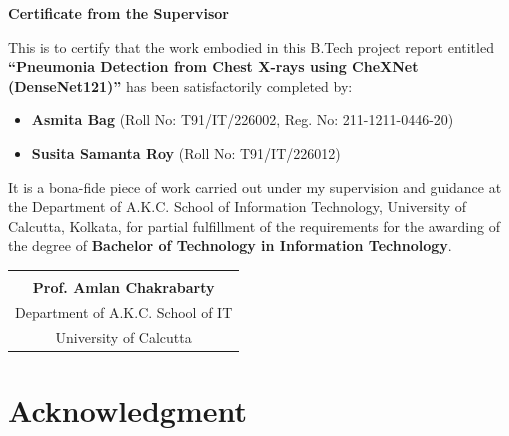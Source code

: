 \documentclass[12pt,oneside]{report}
\begin{document}
\newpage
\thispagestyle{empty}
\vspace*{0.5cm}
\begin{center}
    {\Large\bfseries\color{navyblue} Certificate from the Supervisor}
\end{center}
\vspace*{1cm}

\noindent This is to certify that the work embodied in this B.Tech project report entitled \textbf{``Pneumonia Detection from Chest X-rays using CheXNet (DenseNet121)''} has been satisfactorily completed by:

\begin{itemize}[label=\textbullet, leftmargin=1.5cm, topsep=0.5cm]
    \item \textbf{Asmita Bag} (Roll No: T91/IT/226002, Reg. No: 211-1211-0446-20)
    \item \textbf{Susita Samanta Roy} (Roll No: T91/IT/226012)
\end{itemize}

\vspace*{0.5cm}
\noindent It is a bona-fide piece of work carried out under my supervision and guidance at the Department of A.K.C. School of Information Technology, University of Calcutta, Kolkata, for partial fulfillment of the requirements for the awarding of the degree of \textbf{Bachelor of Technology in Information Technology}.

\vspace*{4cm}
\begin{flushright}
    \begin{tabular}{c}
        \underline{\hspace*{6cm}} \\
        \textbf{Prof. Amlan Chakrabarty} \\
        Department of A.K.C. School of IT \\
        University of Calcutta
    \end{tabular}
\end{flushright}

\newpage
\chapter*{Acknowledgment}
\end{document}
